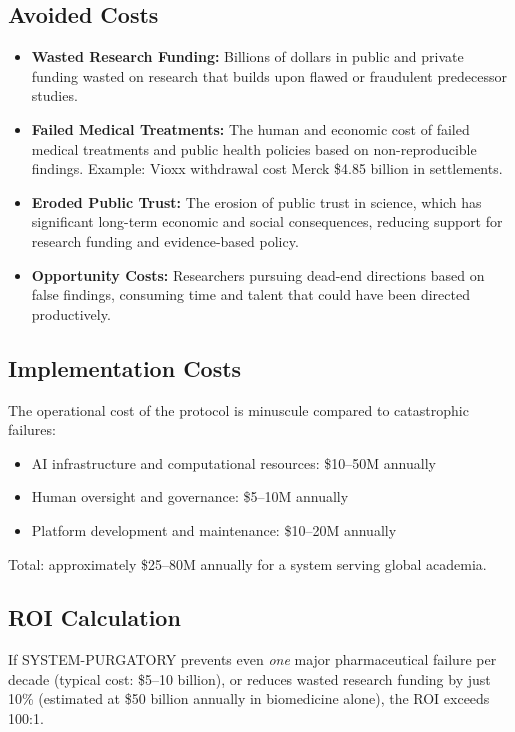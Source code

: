 \documentclass[11pt,a4paper]{article}
\begin{document}
\subsection{Avoided Costs}
\begin{itemize}[nosep]
    \item \textbf{Wasted Research Funding:} Billions of dollars in public and private funding wasted on research that builds upon flawed or fraudulent predecessor studies.
    
    \item \textbf{Failed Medical Treatments:} The human and economic cost of failed medical treatments and public health policies based on non-reproducible findings. Example: Vioxx withdrawal cost Merck \$4.85 billion in settlements.
    
    \item \textbf{Eroded Public Trust:} The erosion of public trust in science, which has significant long-term economic and social consequences, reducing support for research funding and evidence-based policy.
    
    \item \textbf{Opportunity Costs:} Researchers pursuing dead-end directions based on false findings, consuming time and talent that could have been directed productively.
\end{itemize}

\subsection{Implementation Costs}
The operational cost of the protocol is minuscule compared to catastrophic failures:
\begin{itemize}[nosep]
    \item AI infrastructure and computational resources: \$10--50M annually
    \item Human oversight and governance: \$5--10M annually
    \item Platform development and maintenance: \$10--20M annually
\end{itemize}

\noindent Total: approximately \$25--80M annually for a system serving global academia.

\subsection{ROI Calculation}
If SYSTEM-PURGATORY prevents even \textit{one} major pharmaceutical failure per decade (typical cost: \$5--10 billion), or reduces wasted research funding by just 10\% (estimated at \$50 billion annually in biomedicine alone), the ROI exceeds 100:1.
\end{document}
